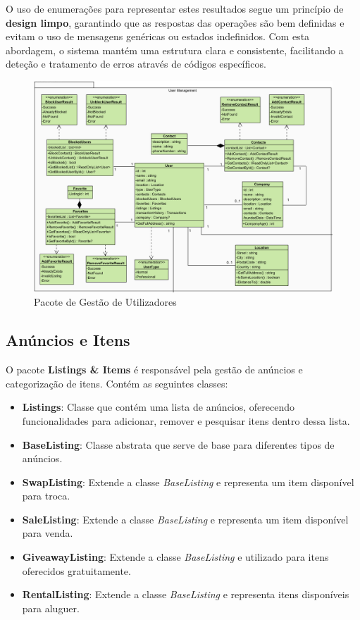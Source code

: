 \documentclass[a4paper, 12pt]{article} %
\begin{document}
O uso de enumerações para representar estes resultados segue um princípio de \textbf{design limpo}, garantindo que as respostas das operações são bem definidas e evitam o uso de mensagens genéricas ou estados indefinidos. Com esta abordagem, o sistema mantém uma estrutura clara e consistente, facilitando a deteção e tratamento de erros através de códigos específicos.

\begin{figure}[ht]
	\centering
	\includegraphics[width=\textwidth]{diagrama_classes_gestao_utilizadores.png}
	\caption{Pacote de Gestão de Utilizadores}
	\label{fig:diagrama_classes_gestao_utilizadores}
\end{figure}

\subsection{Anúncios e Itens}

O pacote \textbf{Listings \& Items} é responsável pela gestão de anúncios e categorização de itens. Contém as seguintes classes:

\begin{itemize}
	\item \textbf{Listings}: Classe que contém uma lista de anúncios, oferecendo funcionalidades para adicionar, remover e pesquisar itens dentro dessa lista.
	\item \textbf{BaseListing}: Classe abstrata que serve de base para diferentes tipos de anúncios.
	\item \textbf{SwapListing}: Extende a classe \textit{BaseListing} e representa um item disponível para troca.
	\item \textbf{SaleListing}: Extende a classe \textit{BaseListing} e representa um item disponível para venda.
	\item \textbf{GiveawayListing}: Extende a classe \textit{BaseListing} e utilizado para itens oferecidos gratuitamente.
	\item \textbf{RentalListing}: Extende a classe \textit{BaseListing} e representa itens disponíveis para aluguer.
\end{itemize}
\end{document}
